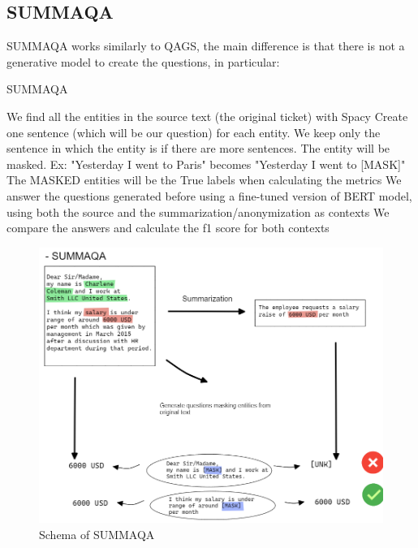 \subsection{SUMMAQA}
SUMMAQA works similarly to QAGS, the main difference is that there is not a generative model to create the questions, in particular:
\begin{algorithm}[h]
    \caption*{SUMMAQA}
    \begin{algorithmic}[1]
      \State We find all the entities in the source text (the original ticket) with Spacy
      \State Create one sentence (which will be our question) for each entity. We keep only the sentence in which the entity is if there are more sentences. The entity will be masked. Ex: "Yesterday I went to Paris" becomes "Yesterday I went to [MASK]"
      \State The MASKED entities will be the True labels when calculating the metrics
      \State We answer the questions generated before using a fine-tuned version of BERT model, using both the source and the summarization/anonymization as contexts
      \State We compare the answers and calculate the f1 score for both contexts
    \end{algorithmic}
\end{algorithm}
\begin{figure}[h] 
    \includegraphics[width=\textwidth]{images/qa_models_summaqa.png}
    \caption{Schema of SUMMAQA}
    \label{fig:schema_summa_qa}
\end{figure} 
\newpage   

